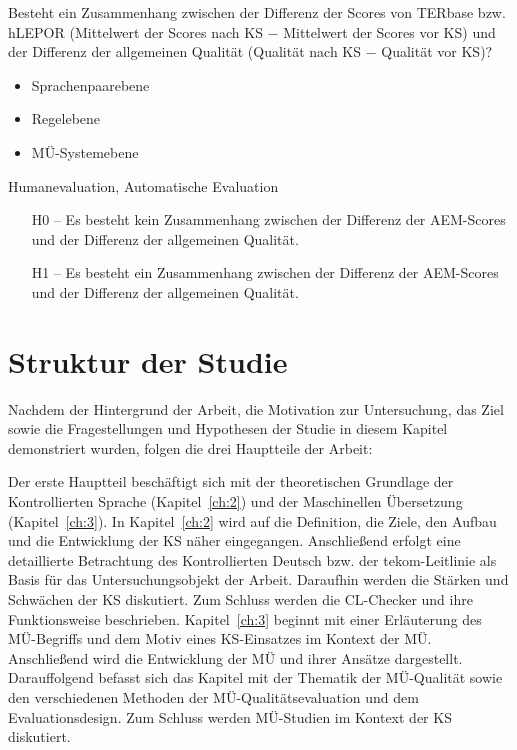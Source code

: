 \begin{description}[font=\normalfont\bfseries]
\item [Fragestellung] Besteht ein Zusammenhang zwischen der Differenz der Scores von TERbase bzw. hLEPOR (Mittelwert der Scores nach KS $-$ Mittelwert der Scores vor KS) und der Differenz der allgemeinen Qualität (Qualität nach KS $-$ Qualität vor KS)?
\item [Analyseebene]\hfill
  \begin{itemize}
  \item Sprachenpaarebene
  \item Regelebene
  \item MÜ-Systemebene
  \end{itemize}
\item [Analysemethode] Humanevaluation, Automatische Evaluation
\item [Hypothesen]\hfill
  \begin{itemize}
  \item [H0] -- Es besteht kein Zusammenhang zwischen der Differenz der AEM-Scores und der Differenz der allgemeinen Qualität.
  \item [H1] -- Es besteht ein Zusammenhang zwischen der Differenz der AEM-Scores und der Differenz der allgemeinen Qualität.
  \end{itemize}
\end{description}



\section{\label{sec:1.4}Struktur der Studie}

Nachdem der Hintergrund der Arbeit, die Motivation zur Untersuchung, das Ziel sowie die Fragestellungen und Hypothesen der Studie in diesem Kapitel demonstriert wurden, folgen die drei Hauptteile der Arbeit:

Der erste Hauptteil beschäftigt sich mit der theoretischen Grundlage der Kontrollierten Sprache (Kapitel~\ref{ch:2}) und der Maschinellen Übersetzung (Kapitel~\ref{ch:3}). In Kapitel~\ref{ch:2} wird auf die Definition, die Ziele, den Aufbau und die Entwicklung der KS näher eingegangen. Anschließend erfolgt eine detaillierte Betrachtung des Kontrollierten Deutsch bzw. der tekom-Leitlinie als Basis für das Untersuchungsobjekt der Arbeit. Daraufhin werden die Stärken und Schwächen der KS diskutiert. Zum Schluss werden die CL-Checker und ihre Funktionsweise beschrieben. Kapitel~\ref{ch:3} beginnt mit einer Erläuterung des MÜ-Begriffs und dem Motiv eines KS-Einsatzes im Kontext der MÜ. Anschließend wird die Entwicklung der MÜ und ihrer Ansätze dargestellt. Darauffolgend befasst sich das Kapitel mit der Thematik der MÜ-Qualität sowie den verschiedenen Methoden der MÜ-Qualitätsevaluation und dem Evaluationsdesign. Zum Schluss werden MÜ-Studien im Kontext der KS diskutiert.

